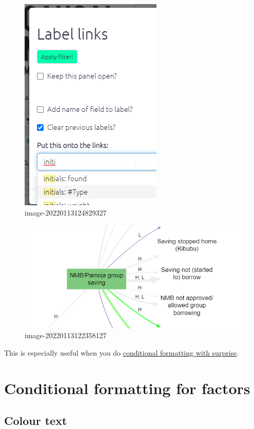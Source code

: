 \documentclass[
]{book}
\begin{document}
\begin{figure}
\centering
\includegraphics{_assets/image-20220113124829327.png}
\caption{image-20220113124829327}
\end{figure}

\begin{figure}
\centering
\includegraphics{_assets/image-20220113122358127.png}
\caption{image-20220113122358127}
\end{figure}

This is especially useful when you do \protect\hyperlink{xsurprise}{conditional formatting with surprise}.

\hypertarget{conditional-formatting-for-factors}{%
\section{Conditional formatting for factors}\label{conditional-formatting-for-factors}}

\hypertarget{xcolour-text}{%
\subsection{Colour text}\label{xcolour-text}}
\end{document}
